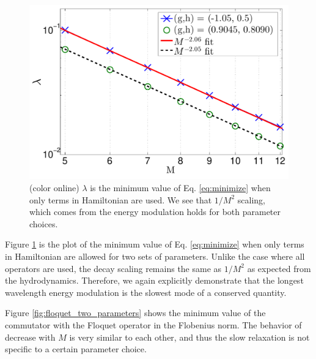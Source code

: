 \documentclass[twocolumn,superscriptaddress, prb]{revtex4-1}
\begin{document}
\begin{figure}
\includegraphics[width=1.0\linewidth]{X_Z_ZZ_only_two_parameters.pdf}
\centering
\caption{(color online) $\lambda$ is the minimum value of Eq. \eqref{eq:minimize} when only terms in Hamiltonian are used. We see that $1/M^2$ scaling, which comes from the energy modulation holds for both parameter choices. }
\label{fig:Ham_only_two_parameters}
\end{figure}
Figure \ref{fig:Ham_only_two_parameters} is the plot of the minimum value of Eq. \eqref{eq:minimize} when only terms in Hamiltonian are allowed
for two sets of parameters. Unlike the case where all operators are used,
the decay scaling remains the same as $1/M^2$ as expected from the hydrodynamics.
Therefore, we again explicitly demonstrate that the longest wavelength energy modulation is the slowest mode of a conserved quantity.



Figure \ref{fig:floquet_two_parameters} shows the minimum value of the commutator with the Floquet operator in the Flobenius norm.
The behavior of decrease with $M$ is very similar to each other,
and thus the slow relaxation is not specific to a certain parameter choice.
\end{document}
